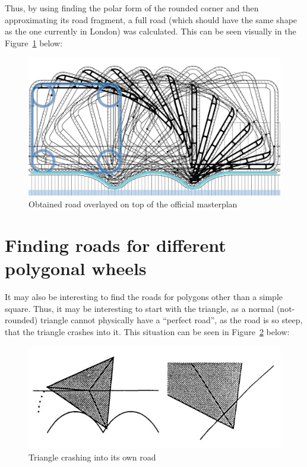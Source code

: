 \documentclass[12pt]{article}
\begin{document}
        Thus, by using finding the polar form of the rounded corner and then approximating its road fragment, a full road (which should have the same shape as the one currently in London) was calculated. This can be seen visually in the Figure~\ref{fig:masterplan_overlayed} below:

        \begin{figure}[H]
            \centering
            \includegraphics[width=0.8\linewidth]{images/masterplan_overlayed.png}
            \caption[Obtained road overlayed on top of the official masterplan]{Obtained road overlayed on top of the official masterplan\footnotemark}\label{fig:masterplan_overlayed}
        \end{figure}

    \section{Finding roads for different polygonal wheels}

        It may also be interesting to find the roads for polygons other than a simple square. Thus, it may be interesting to start with the triangle, as a normal (not-rounded) triangle cannot physically have a ``perfect road'', as the road is so steep, that the triangle crashes into it. This situation can be seen in Figure~\ref{fig:triangle_crash} below:

        \begin{figure}[H]
            \centering
            \includegraphics[width=0.7\linewidth]{images/triangle_wheel.jpg}
            \caption{Triangle crashing into its own road\cite{Hall_Wagon_1992}}\label{fig:triangle_crash}
        \end{figure}
\end{document}
